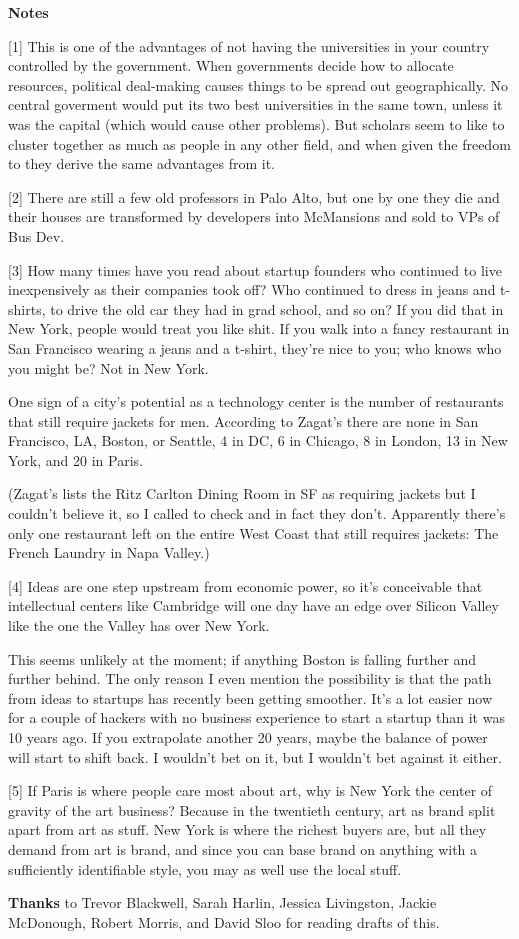 \textbf{Notes}

{[}1{]} This is one of the advantages of not having the universities in
your country controlled by the government. When governments decide how
to allocate resources, political deal-making causes things to be spread
out geographically. No central goverment would put its two best
universities in the same town, unless it was the capital (which would
cause other problems). But scholars seem to like to cluster together as
much as people in any other field, and when given the freedom to they
derive the same advantages from it.

{[}2{]} There are still a few old professors in Palo Alto, but one by
one they die and their houses are transformed by developers into
McMansions and sold to VPs of Bus Dev.

{[}3{]} How many times have you read about startup founders who
continued to live inexpensively as their companies took off? Who
continued to dress in jeans and t-shirts, to drive the old car they had
in grad school, and so on? If you did that in New York, people would
treat you like shit. If you walk into a fancy restaurant in San
Francisco wearing a jeans and a t-shirt, they're nice to you; who knows
who you might be? Not in New York.

One sign of a city's potential as a technology center is the number of
restaurants that still require jackets for men. According to Zagat's
there are none in San Francisco, LA, Boston, or Seattle, 4 in DC, 6 in
Chicago, 8 in London, 13 in New York, and 20 in Paris.

(Zagat's lists the Ritz Carlton Dining Room in SF as requiring jackets
but I couldn't believe it, so I called to check and in fact they don't.
Apparently there's only one restaurant left on the entire West Coast
that still requires jackets: The French Laundry in Napa Valley.)

{[}4{]} Ideas are one step upstream from economic power, so it's
conceivable that intellectual centers like Cambridge will one day have
an edge over Silicon Valley like the one the Valley has over New York.

This seems unlikely at the moment; if anything Boston is falling further
and further behind. The only reason I even mention the possibility is
that the path from ideas to startups has recently been getting smoother.
It's a lot easier now for a couple of hackers with no business
experience to start a startup than it was 10 years ago. If you
extrapolate another 20 years, maybe the balance of power will start to
shift back. I wouldn't bet on it, but I wouldn't bet against it either.

{[}5{]} If Paris is where people care most about art, why is New York
the center of gravity of the art business? Because in the twentieth
century, art as brand split apart from art as stuff. New York is where
the richest buyers are, but all they demand from art is brand, and since
you can base brand on anything with a sufficiently identifiable style,
you may as well use the local stuff.

\textbf{Thanks} to Trevor Blackwell, Sarah Harlin, Jessica Livingston,
Jackie McDonough, Robert Morris, and David Sloo for reading drafts of
this.
